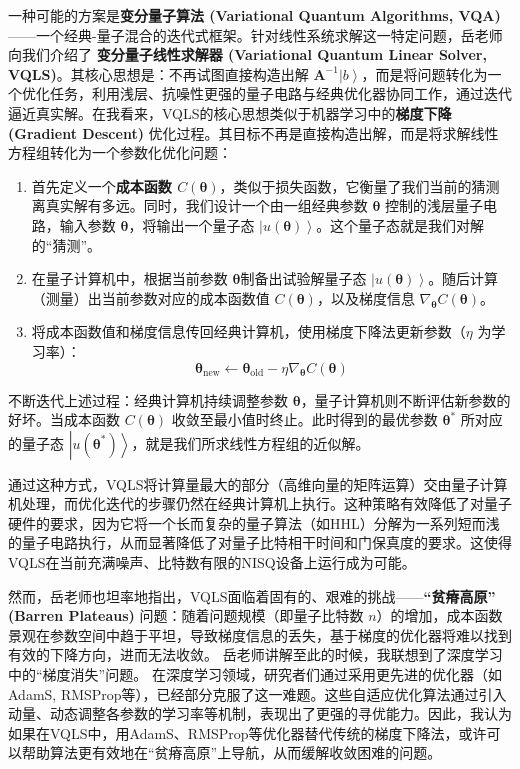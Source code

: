 \documentclass[12pt, a4paper]{article}
\newcommand{\ivec}[1]{\bm{#1}}                  %
\newcommand{\scalarfield}{u}                    %
\newcommand{\ket}[1]{\left| #1 \right\rangle}   %
\newcommand{\mat}[1]{\mathbf{#1}}               %
\begin{document}
一种可能的方案是\textbf{变分量子算法 (Variational Quantum Algorithms, VQA)}——一个经典-量子混合的迭代式框架。针对线性系统求解这一特定问题，岳老师向我们介绍了 \textbf{变分量子线性求解器 (Variational Quantum Linear Solver, VQLS)}。其核心思想是：不再试图直接构造出解 $\mat{A}^{-1}\ket{b}$，而是将问题转化为一个优化任务，利用浅层、抗噪性更强的量子电路与经典优化器协同工作，通过迭代逼近真实解。在我看来，VQLS的核心思想类似于机器学习中的\textbf{梯度下降 (Gradient Descent)} 优化过程。其目标不再是直接构造出解，而是将求解线性方程组转化为一个参数化优化问题：

\begin{enumerate}
    \item 首先定义一个\textbf{成本函数 $C(\ivec{\theta})$}，类似于损失函数，它衡量了我们当前的猜测离真实解有多远。同时，我们设计一个由一组经典参数 $\ivec{\theta}$ 控制的浅层量子电路，输入参数 $\ivec{\theta}$，将输出一个量子态 $\ket{\scalarfield(\ivec{\theta})}$。这个量子态就是我们对解的“猜测”。

    \item 在量子计算机中，根据当前参数 $\ivec{\theta}$制备出试验解量子态 $\ket{\scalarfield(\ivec{\theta})}$。随后计算（测量）出当前参数对应的成本函数值 $C(\ivec{\theta})$，以及梯度信息 $\nabla_{\ivec{\theta}} C(\ivec{\theta})$。

    \item 将成本函数值和梯度信息传回经典计算机，使用梯度下降法更新参数（$\eta$ 为学习率）：
    \begin{equation*}
        \ivec{\theta}_{\text{new}} \leftarrow \ivec{\theta}_{\text{old}} - \eta \nabla_{\ivec{\theta}} C(\ivec{\theta})
    \end{equation*}
\end{enumerate}

不断迭代上述过程：经典计算机持续调整参数 $\ivec{\theta}$，量子计算机则不断评估新参数的好坏。当成本函数 $C(\ivec{\theta})$ 收敛至最小值时终止。此时得到的最优参数 $\ivec{\theta}^*$ 所对应的量子态 $\ket{\scalarfield(\ivec{\theta}^*)}$，就是我们所求线性方程组的近似解。

通过这种方式，VQLS将计算量最大的部分（高维向量的矩阵运算）交由量子计算机处理，而优化迭代的步骤仍然在经典计算机上执行。这种策略有效降低了对量子硬件的要求，因为它将一个长而复杂的量子算法（如HHL）分解为一系列短而浅的量子电路执行，从而显著降低了对量子比特相干时间和门保真度的要求。这使得VQLS在当前充满噪声、比特数有限的NISQ设备上运行成为可能。

然而，岳老师也坦率地指出，VQLS面临着固有的、艰难的挑战——\textbf{“贫瘠高原” (Barren Plateaus)} 问题：随着问题规模（即量子比特数 $n$）的增加，成本函数景观在参数空间中趋于平坦，导致梯度信息的丢失，基于梯度的优化器将难以找到有效的下降方向，进而无法收敛。
岳老师讲解至此的时候，我联想到了深度学习中的“梯度消失”问题。
在深度学习领域，研究者们通过采用更先进的优化器（如AdamS, RMSProp等），已经部分克服了这一难题。这些自适应优化算法通过引入动量、动态调整各参数的学习率等机制，表现出了更强的寻优能力。因此，我认为如果在VQLS中，用AdamS、RMSProp等优化器替代传统的梯度下降法，或许可以帮助算法更有效地在“贫瘠高原”上导航，从而缓解收敛困难的问题。
\end{document}

